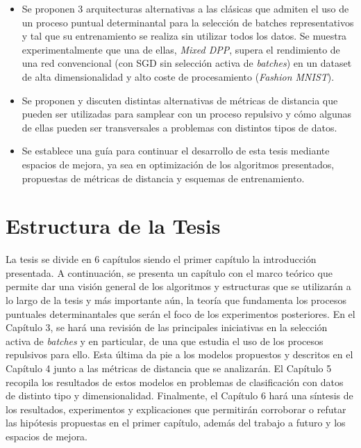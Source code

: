 \begin{itemize}
    \item Se proponen 3 arquitecturas alternativas a las clásicas que admiten el uso de un proceso puntual determinantal para la selección de batches representativos y tal que su entrenamiento se realiza sin utilizar todos los datos. Se muestra experimentalmente que una de ellas, \textit{Mixed DPP}, supera el rendimiento de una red convencional (con SGD sin selección activa de \textit{batches}) en un dataset de alta dimensionalidad y alto coste de procesamiento (\textit{Fashion MNIST}). 
 
    \item Se proponen y discuten distintas alternativas de métricas de distancia que pueden ser utilizadas para samplear con un proceso repulsivo y cómo algunas de ellas pueden ser transversales a problemas con distintos tipos de datos. 

    \item Se establece una guía para continuar el desarrollo de esta tesis mediante espacios de mejora, ya sea en optimización de los algoritmos presentados, propuestas de métricas de distancia y esquemas de entrenamiento.

\end{itemize}


\section{Estructura de la Tesis}

La tesis se divide en 6 capítulos siendo el primer capítulo la introducción presentada. A continuación, se presenta un capítulo con el marco teórico que permite dar una visión general de los algoritmos y estructuras que se utilizarán a lo largo de la tesis y más importante aún, la teoría que fundamenta los procesos puntuales determinantales que serán el foco de los experimentos posteriores. En el Capítulo 3, se hará una revisión de las principales iniciativas en la selección activa de \textit{batches} y en particular, de una que estudia el uso de los procesos repulsivos para ello. Esta última da pie a los modelos propuestos y descritos en el Capítulo 4 junto a las métricas de distancia que se analizarán. El Capítulo 5 recopila los resultados de estos modelos en problemas de clasificación con datos de distinto tipo y dimensionalidad. Finalmente, el Capítulo 6 hará una síntesis de los resultados, experimentos y explicaciones que permitirán corroborar o refutar las hipótesis propuestas en el primer capítulo, además del trabajo a futuro y los espacios de mejora. 

